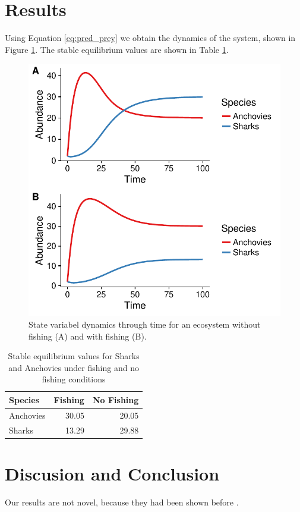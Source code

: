 \documentclass{frontiersSCNS}
\begin{document}
\clearpage

\section{Results}\label{results}

Using Equation \ref{eq:pred_prey} we obtain the dynamics of the system,
shown in Figure \ref{fig:timeseries}. The stable equilibrium values are
shown in Table \ref{tab:stable_eq}.

\begin{figure}
\centering
\includegraphics{AwesomeArticle_files/figure-latex/unnamed-chunk-8-1.pdf}
\caption{\label{fig:unnamed-chunk-8}\label{fig:timeseries}State variabel
dynamics through time for an ecosystem without fishing (A) and with
fishing (B).}
\end{figure}

\begin{table}[H]

\caption{\label{tab:unnamed-chunk-9}\label{tab:stable_eq}Stable equilibrium values for Sharks and Anchovies under fishing and no fishing conditions}
\centering
\begin{tabular}[t]{l|r|r}
\hline
Species & Fishing & No Fishing\\
\hline
Anchovies & 30.05 & 20.05\\
\hline
Sharks & 13.29 & 29.88\\
\hline
\end{tabular}
\end{table}

\section{Discusion and Conclusion}\label{discusion-and-conclusion}

Our results are not novel, because they had been shown before
\citep{szuwalski_2017}.

\clearpage


\end{document}
